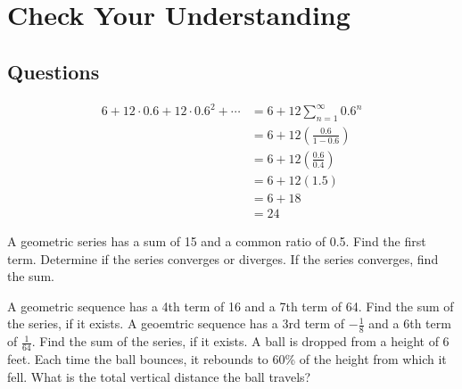 \documentclass[addpoints]{exam}
\begin{document}
\section*{Check Your Understanding}

\begin{minipage}[t]{.7\linewidth}
    \subsection*{Questions}
\begin{questions}
    
    \begin{solution}
        \begin{align*}
            6+12\cdot0.6+12\cdot0.6^2+\cdots&=6+12\sum_{n=1}^\infty 0.6^n\\
            &=6+12\left(\frac{0.6}{1-0.6}\right)\\
            &=6+12\left(\frac{0.6}{0.4}\right)\\
            &=6+12(1.5)\\
            &=6+18\\
            &=24
        \end{align*}
    \end{solution}
    \question A geometric series has a sum of 15 and a common ratio of 0.5. Find the first term.
    \question Determine if the series converges or diverges. If the series converges, find the sum.
    \question A geometric sequence has a 4th term of 16 and a 7th term of 64. Find the sum of the series, if it exists.
    \question A geoemtric sequence has a 3rd term of $-\frac{1}{8}$ and a 6th term of $\frac{1}{64}$. Find the sum of the series, if it exists.
    \question A ball is dropped from a height of 6 feet. Each time the ball bounces, it rebounds to 60\% of the height from which it fell. What is the total vertical distance the ball travels?
\end{questions}
\end{minipage}
\hfill
\begin{minipage}[t]{.25\linewidth}
    
\end{minipage}

\vspace{.2in}


\end{document}
